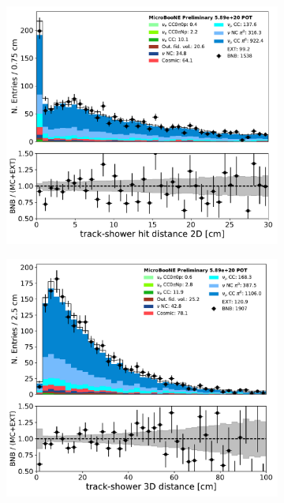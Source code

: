 \begin{figure}[H] 
\begin{center}
    \begin{subfigure}[b]{0.3\textwidth}
    \centering
    \includegraphics[width=1.00\textwidth]{pi0/nueselection/trkshrhitdist2_03112020_ALL_scaled.pdf}
    \caption{}
    \end{subfigure}
    \begin{subfigure}[b]{0.3\textwidth}
    \centering
    \includegraphics[width=1.00\textwidth]{pi0/nueselection/tksh_distance_03112020_ALL_scaled.pdf}

\end{subfigure}
\end{center}
\end{figure}
